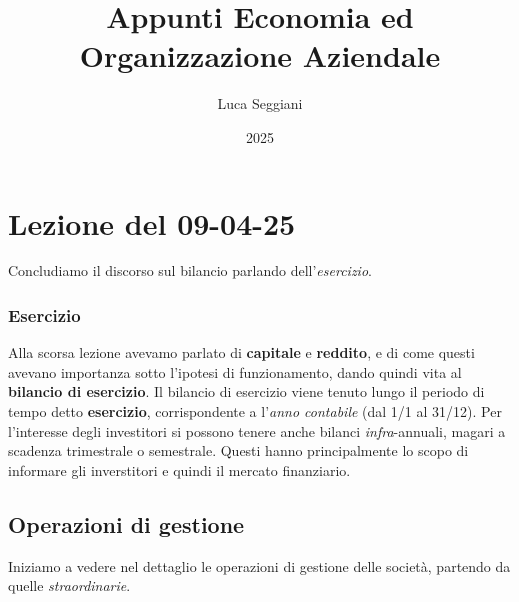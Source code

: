 \documentclass[a4paper,11pt]{article}
\title{Appunti Economia ed Organizzazione Aziendale}
\author{Luca Seggiani}
\date{2025}
\begin{document}
\section{Lezione del 09-04-25}

\thispagestyle{empty}
\pagestyle{fancy}

Concludiamo il discorso sul bilancio parlando dell'\textit{esercizio}.

\subsubsection{Esercizio}
Alla scorsa lezione avevamo parlato di \textbf{capitale} e \textbf{reddito}, e di come questi avevano importanza sotto l'ipotesi di funzionamento, dando quindi vita al \textbf{bilancio di esercizio}.
Il bilancio di esercizio viene tenuto lungo il periodo di tempo detto \textbf{esercizio}, corrispondente a l'\textit{anno contabile} (dal 1/1 al 31/12).
Per l'interesse degli investitori si possono tenere anche bilanci \textit{infra}-annuali, magari a scadenza trimestrale o semestrale.
Questi hanno principalmente lo scopo di informare gli inverstitori e quindi il mercato finanziario.

\subsection{Operazioni di gestione}
Iniziamo a vedere nel dettaglio le operazioni di gestione delle società, partendo da quelle \textit{straordinarie}.
\end{document}
